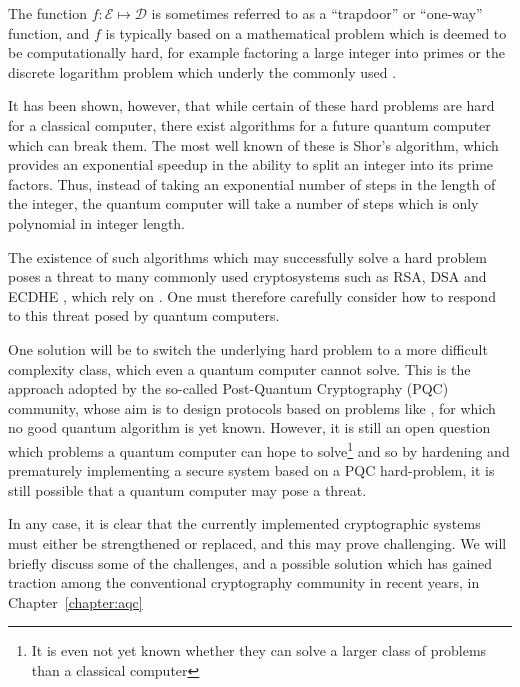 The function $f: \mathcal{E} \mapsto \mathcal{D}$ is sometimes referred to as a ``trapdoor'' or ``one-way'' function, and $f$ is typically based on a mathematical problem which is deemed to be computationally hard, for example factoring a large integer into primes  or the discrete logarithm problem  which underly the commonly used . 




It has been shown, however, that while certain of these hard problems are hard for a classical computer, there exist algorithms for a future quantum computer which can break them. The most well known of these is Shor's algorithm, \cite{Shor1997} which provides an exponential speedup in the ability to split an integer into its prime factors. Thus, instead of taking an exponential number of steps in the length of the integer, the quantum computer will take a number of steps which is only polynomial in integer length. 

The existence of such algorithms which may successfully solve a hard problem poses a threat to many commonly used cryptosystems such as RSA, DSA and ECDHE , which rely on . One must therefore carefully consider how to respond to this threat posed by quantum computers. 

One solution will be to switch the underlying hard problem to a more difficult complexity class, which even a quantum computer cannot solve. This is the approach adopted by the so-called Post-Quantum Cryptography (PQC) community, whose aim is to design protocols based on problems like , for which no good quantum algorithm is yet known. However, it is still an open question which problems a quantum computer can hope to solve\footnote{It is even not yet known whether they can solve a larger class of problems than a classical computer} and so by hardening and prematurely implementing a secure system based on a PQC hard-problem, it is still possible that a quantum computer may pose a threat.  

In any case, it is clear that the currently implemented cryptographic systems must either be strengthened or replaced, and this may prove challenging. We will briefly discuss some of the challenges, and a possible solution which has gained traction among the conventional cryptography community in recent years, in Chapter~\ref{chapter:aqc}

